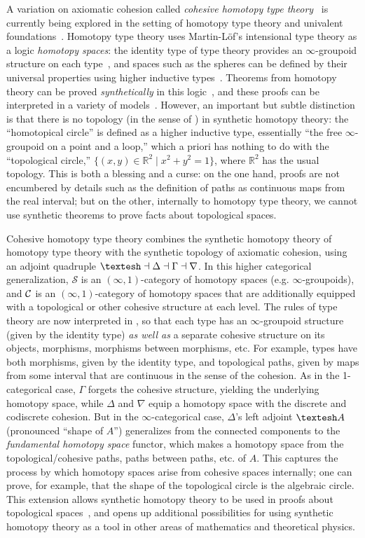 \documentclass{drl-common/llncs}
\begin{document}
A variation on axiomatic cohesion called \emph{cohesive homotopy type
  theory}~\citep{ss,s15} is currently being explored in the setting of
homotopy type theory and univalent
foundations~\citep{voevodsky06note,uf13hott-book}.  Homotopy type theory
uses Martin-L\"of's intensional type theory as a logic \emph{homotopy
  spaces}: the identity type of type theory provides an
$\infty$-groupoid structure on each type~\citep{...}, and spaces such as
the spheres can be defined by their universal properties using higher
inductive types~\citep{...}.  Theorems from homotopy theory can be
proved \emph{synthetically} in this
logic~\citep{ls13pi1s1,lb13pinsn,...}, and these proofs can be
interpreted in a variety of models~\citep{...}.  However, an important
but subtle distinction is that there is no topology (in the sense of
\citep{scott,etc}) in synthetic homotopy theory: the ``homotopical
circle'' is defined as a higher inductive type, essentially ``the free
$\infty$-groupoid on a point and a loop,'' which a priori has nothing to
do with the ``topological circle,'' $\{ (x,y) \in \mathbb{R}^2 \mid x^2
+ y^2 = 1\}$, where $\mathbb{R}^2$ has the usual topology.  This is both
a blessing and a curse: on the one hand, proofs are not encumbered by
details such as the definition of paths as continuous maps from the real
interval; but on the other, internally to homotopy type theory, we
cannot use synthetic theorems to prove facts about topological spaces.

Cohesive homotopy type theory combines the synthetic homotopy theory of
homotopy type theory with the synthetic topology of axiomatic cohesion,
using an adjoint quadruple $\sh \la \Delta \la \Gamma \la \nabla$.  In
this higher categorical generalization, $\mathcal{S}$ is an
$(\infty,1)$-category of homotopy spaces (e.g. $\infty$-groupoids), and
$\mathcal{C}$ is an $(\infty,1)$-category of homotopy spaces that are
additionally equipped with a topological or other cohesive structure at
each level.  The rules of type theory are now interpreted in \C, so that
each type has an $\infty$-groupoid structure (given by the identity
type) \emph{as well as} a separate cohesive structure on its objects,
morphisms, morphisms between morphisms, etc.  For example, types have
both morphisms, given by the identity type, and topological paths, given
by maps from some interval that are continuous in the sense of the
cohesion.  As in the 1-categorical case, $\Gamma$ forgets the cohesive
structure, yielding the underlying homotopy space, while $\Delta$ and
$\nabla$ equip a homotopy space with the discrete and codiscrete
cohesion.  But in the $\infty$-categorical case, $\Delta$'s left adjoint
$\sh A$ (pronounced ``shape of $A$'') generalizes from the connected
components to the \emph{fundamental homotopy space} functor, which makes
a homotopy space from the topological/cohesive paths, paths between
paths, etc. of $A$.  This captures the process by which homotopy spaces
arise from cohesive spaces internally; one can prove, for example, that
the shape of the topological circle is the algebraic circle.  This
extension allows synthetic homotopy theory to be used in proofs about
topological spaces~\citep{s15}, and opens up additional possibilities
for using synthetic homotopy theory as a tool in other areas of
mathematics and theoretical physics.  
\end{document}
